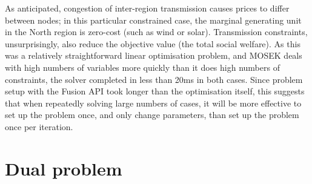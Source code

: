\documentclass[11pt,a4paper]{article}
\numberwithin{equation}{section}
\begin{document}
As anticipated, congestion of inter-region transmission causes prices to differ between nodes; in this particular constrained case, the marginal generating unit in the North region is zero-cost (such as wind or solar).
Transmission constraints, unsurprisingly, also reduce the objective value (the total social welfare).
As this was a relatively straightforward linear optimisation problem, and MOSEK deals with high numbers of variables more quickly than it does high numbers of constraints, the solver completed in less than 20ms in both cases.
Since problem setup with the Fusion API took longer than the optimisation itself, this suggests that when repeatedly solving large numbers of cases, it will be more effective to set up the problem once, and only change parameters, than set up the problem once per iteration.

\FloatBarrier

\section{Dual problem}
\label{sec:dual}
\end{document}
